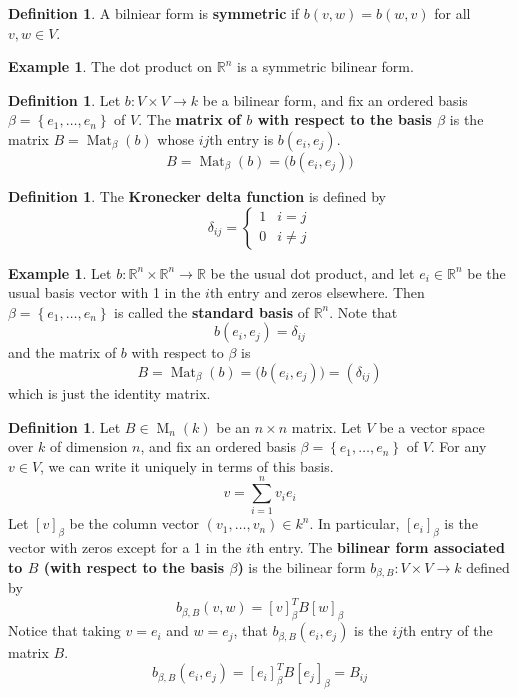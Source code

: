 \documentclass[12pt]{article}
\theoremstyle{definition}
\newtheorem{definition}[theorem]{Definition}
\newtheorem{example}[theorem]{Example}
\numberwithin{theorem}{subsection}
\newcommand{\R}{\mathbb{R}}
\newcommand{\lb}{\left\{}
\newcommand{\rb}{\right\}}
\newcommand{\tbf}{\textbf}
\DeclareMathOperator{\M}{M}
\DeclareMathOperator{\Mat}{Mat}
\begin{document}
\begin{definition}
A bilniear form is \tbf{symmetric} if $b(v,w) = b(w,v)$ for all $v,w \in V$.
\end{definition}

\begin{example}
The dot product on $\R^n$ is a symmetric bilinear form.
\end{example}

\begin{definition}
Let $b:V \times V \to k$ be a bilinear form, and fix an ordered basis $\beta = \lb e_1, \ldots, e_n \rb$ of $V$. The \tbf{matrix of $b$ with respect to the basis $\beta$} is the matrix $B = \Mat_\beta(b)$ whose $ij$th entry is $b(e_i, e_j)$.
\[
	B = \Mat_\beta(b) = \Big( b(e_i, e_j) \Big)
\]
\end{definition}

\begin{definition}
The \tbf{Kronecker delta function} is defined by
\[
	\delta_{ij} =
	\begin{cases}
		1 & i = j \\
		0 & i \neq j
	\end{cases}
\]
\end{definition}

\begin{example}
Let $b:\R^n \times \R^n \to \R$ be the usual dot product, and let $e_i \in \R^n$ be the usual basis vector with 1 in the $i$th entry and zeros elsewhere. Then $\beta = \lb e_1, \ldots, e_n \rb$ is called the \tbf{standard basis} of $\R^n$. Note that
\[
	b(e_i, e_j) = \delta_{ij}
\]
and the matrix of $b$ with respect to $\beta$ is
\[
	B = \Mat_\beta(b) = \Big( b(e_i, e_j) \Big) = (\delta_{ij})
\]
which is just the identity matrix.
\end{example}

\begin{definition}
Let $B \in \M_n(k)$ be an $n \times n$ matrix. Let $V$ be a vector space over $k$ of dimension $n$, and fix an ordered basis $\beta = \lb e_1, \ldots, e_n \rb$ of $V$. For any $v \in V$, we can write it uniquely in terms of this basis.
\[
	v = \sum_{i=1}^n v_i e_i
\]
Let $[v]_\beta$ be the column vector $(v_1, \ldots, v_n) \in k^n$. In particular, $[e_i]_\beta$ is the vector with zeros except for a 1 in the $i$th entry. The \tbf{bilinear form associated to $B$ (with respect to the basis $\beta$)} is the bilinear form $b_{\beta, B}:V \times V \to k$ defined by
\[
	b_{\beta, B}(v, w) = [v]_\beta^T B [w]_\beta
\]
Notice that taking $v = e_i$ and $w = e_j$, that $b_{\beta, B}(e_i, e_j)$ is the $ij$th entry of the matrix $B$.
\[
	b_{\beta, B}(e_i,e_j) = [e_i]_\beta^T B [e_j]_\beta = B_{ij}
\]
\end{definition}
\end{document}

